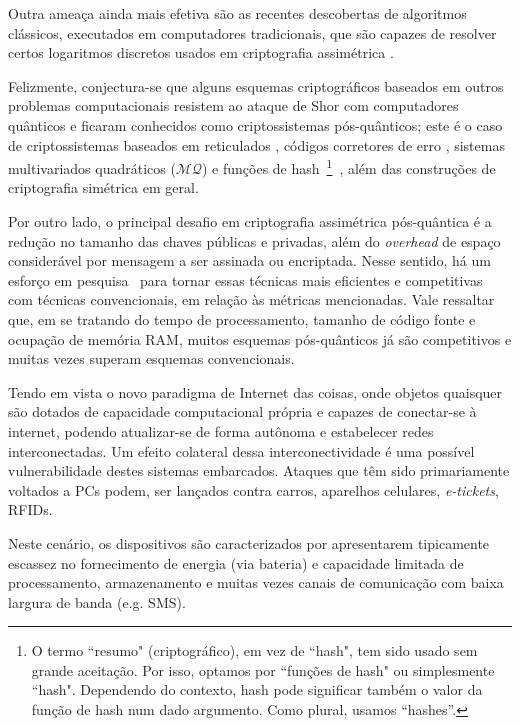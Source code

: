 \documentclass{SBCbookchapter}
\newcommand{\MQ}{\mathcal{MQ}}
\begin{document}
\begin{otherlanguage}{brazilian}
Outra ameaça ainda mais efetiva são as recentes descobertas de algoritmos clássicos, executados em computadores tradicionais, que são capazes de resolver certos logaritmos discretos usados em criptografia assimétrica \cite{barbulescu}.

Felizmente, conjectura-se que alguns esquemas criptográficos baseados em outros problemas computacionais resistem ao ataque de Shor com computadores quânticos e ficaram conhecidos como criptossistemas pós-quânticos; este é o caso de criptossistemas baseados em reticulados \cite{Goldreich-Goldwasser-Halevi}, códigos corretores de erro \cite{McEliece,Niederreiter}, sistemas multivariados quadráticos ($\MQ$) \cite{ding-schmidt,kipnis-patarin-goubin} e funções de hash~\footnote{O termo ``resumo" (criptográfico), em vez de ``hash", tem sido usado sem grande aceitação. Por isso, optamos por ``funções de hash" ou simplesmente ``hash". Dependendo do contexto, hash pode significar também o valor da função de hash num dado argumento. Como plural, usamos ``hashes''.}~\cite{ding-schmidt,dods-smart-stam}, além das construções de criptografia simétrica em geral. 

Por outro lado, o principal desafio em criptografia assimétrica pós-quântica é a redução no tamanho das chaves públicas e privadas, além do \emph{overhead} de espaço considerável por mensagem a ser assinada ou encriptada. Nesse sentido, há um esforço em pesquisa~\cite{bernstein-buchmann-dahmen} para tornar essas técnicas mais eficientes e competitivas com técnicas convencionais, em relação às métricas mencionadas. Vale ressaltar que, em se tratando do tempo de processamento, tamanho de código fonte e ocupação de memória RAM, muitos esquemas pós-quânticos já são competitivos e muitas vezes superam esquemas convencionais.

Tendo em vista o novo paradigma de Internet das coisas, onde objetos quaisquer são dotados de capacidade computacional própria e capazes de conectar-se à internet, podendo atualizar-se de forma autônoma e estabelecer redes interconectadas. Um efeito colateral dessa interconectividade é uma possível vulnerabilidade destes sistemas embarcados. Ataques que têm sido primariamente voltados a PCs podem, ser lançados contra carros, aparelhos celulares, \emph{e-tickets}, RFIDs. 

Neste cenário, os dispositivos são caracterizados por apresentarem tipicamente escassez no fornecimento de energia (via bateria) e capacidade limitada de processamento, armazenamento e muitas vezes canais de comunicação com baixa largura de banda (e.g. SMS).


\end{otherlanguage}
\end{document}
